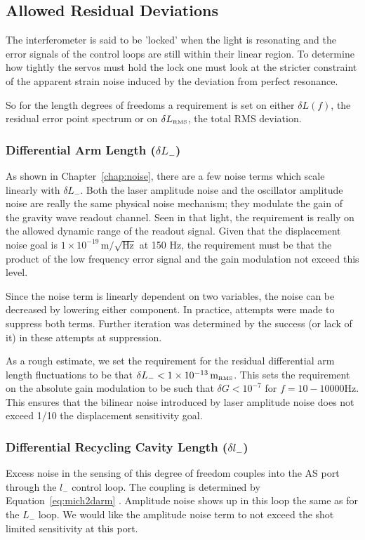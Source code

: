 \subsection{Allowed Residual Deviations}
\label{sec:residual_req}

The interferometer is said to be 'locked' when the light is resonating
and the error signals of the control loops are still within their linear
region. To determine how tightly the servos must hold the lock one must
look at the stricter constraint of the apparent strain noise
induced by the deviation from perfect resonance.

So for the length degrees of freedoms a requirement is set on either
$\delta L(f)$, the residual error point spectrum or on 
$\delta L_{\mbox {\tiny RMS}}$,
the total RMS deviation.

\subsubsection{Differential Arm Length ($\delta L_-$)}

As shown in Chapter~\ref{chap:noise}, there are a few noise terms which 
scale linearly with $\delta L_-$. Both the laser amplitude noise and the 
oscillator amplitude noise are really the same physical noise mechanism; 
they modulate the gain of the gravity wave readout channel. 
Seen in that light, the requirement is really on the allowed dynamic 
range of the readout signal. Given that the displacement noise goal is 
$1 \times 10^{-19} \, \mbox{m}/\sqrt{\mbox{Hz}}$
at 150 Hz, the requirement must be that the product of the low frequency
error signal and the gain modulation not exceed this level.

Since the noise term is linearly dependent on two variables, the noise
can be decreased by lowering either component. In practice, attempts
were made to suppress both terms. Further iteration was determined by the
success (or lack of it) in these attempts at suppression.

As a rough estimate, we set the requirement for the residual differential
arm length fluctuations to be that 
{ $\delta L_- < 1 \times 10^{-13} \, \mbox{m}_{\mbox {\tiny RMS}}$}.
This sets the requirement on the absolute gain modulation to be such that
$\delta G < 10^{-7}$ for $f = 10-10000  \mbox{Hz}$. 
This ensures that the bilinear noise introduced by laser amplitude noise does 
not exceed 1/10 the displacement sensitivity goal. 


\subsubsection{Differential Recycling Cavity Length ($\delta l_-$)}
Excess noise in the sensing of this degree of freedom couples into the
AS port through the $l_{-}$ control loop. The coupling is determined by
Equation~\ref{eq:mich2darm} . Amplitude noise shows up in this loop the same as
for the $L_{-}$ loop. We would like the amplitude noise term
to not exceed the shot limited sensitivity at this port.

